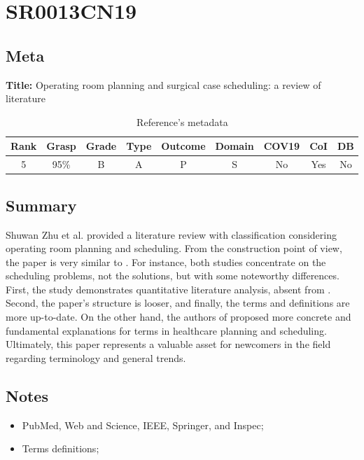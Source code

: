 \section{ SR0013CN19 }


\subsection{Meta}

    \textbf{Title:}
    Operating room planning and surgical case scheduling: a review of literature

    \begin{table}[H]
        \centering
        \begin{tabular}{|c|c|c|c|c|c|c|c|c|}
            \hline
                \textbf{Rank} & \textbf{Grasp} & \textbf{Grade} & \textbf{Type} & \textbf{Outcome} & \textbf{Domain} & \textbf{COV19} & \textbf{CoI} & \textbf{DB} \\
            \hline
                5 & 95\% & B & A & P & S & No & Yes & No \\
            \hline
        \end{tabular}
        \caption{Reference's metadata}
        \label{tab:SR0013CN19}
    \end{table}

\subsection{Summary}
    Shuwan Zhu et al. \cite{x203} provided a literature review with classification considering operating room planning and scheduling. From the construction point of view, the paper is very similar to \cite{x029}. For instance, both studies concentrate on the scheduling problems, not the solutions, but with some noteworthy differences. First, the study demonstrates quantitative literature analysis, absent from \cite{x029}. Second, the paper's structure is looser, and finally, the terms and definitions are more up-to-date. On the other hand, the authors of \cite{x029} proposed more concrete and fundamental explanations for terms in healthcare planning and scheduling. Ultimately, this paper represents a valuable asset for newcomers in the field regarding terminology and general trends.

\subsection{Notes}
    \begin{itemize}
        \item PubMed, Web and Science, IEEE, Springer, and Inspec;
        \item Terms definitions;
    \end{itemize}


